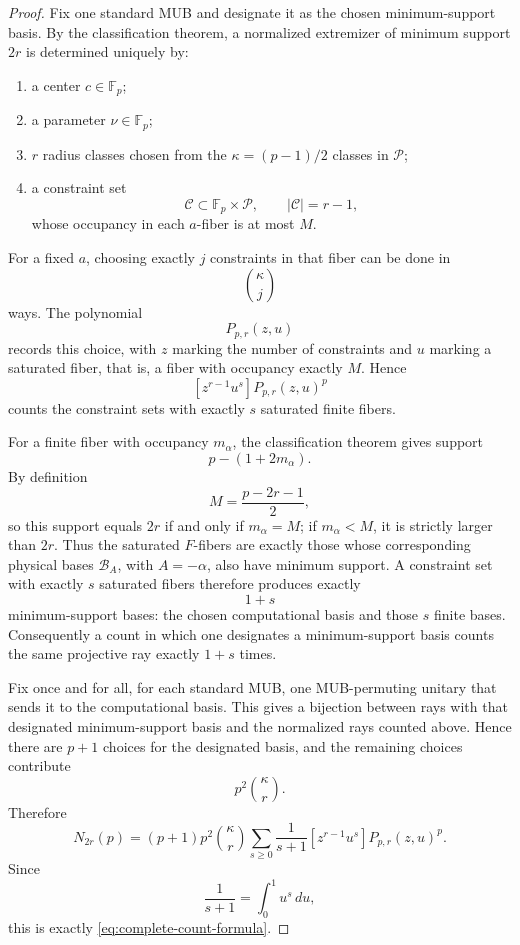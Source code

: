 \documentclass[11pt]{article}
\newcommand{\F}{\mathbb F}
\begin{document}
\begin{proof}
Fix one standard MUB and designate it as the chosen minimum-support
basis.  By the classification theorem, a normalized extremizer of
minimum support \(2r\) is determined uniquely by:

\begin{enumerate}
\item a center \(c\in\F_p\);
\item a parameter \(\nu\in\F_p\);
\item \(r\) radius classes chosen from the \(\kappa=(p-1)/2\) classes in
\(\mathcal P\);
\item a constraint set
\[
 \mathcal C\subset\F_p\times\mathcal P,
 \qquad
 |\mathcal C|=r-1,
\]
whose occupancy in each \(a\)-fiber is at most \(M\).
\end{enumerate}

For a fixed \(a\), choosing exactly \(j\) constraints in that fiber can
be done in
\[
 \binom{\kappa}{j}
\]
ways.  The polynomial
\[
 P_{p,r}(z,u)
\]
records this choice, with \(z\) marking the number of constraints and
\(u\) marking a saturated fiber, that is, a fiber with occupancy
exactly \(M\).  Hence
\[
 [z^{r-1}u^s]P_{p,r}(z,u)^p
\]
counts the constraint sets with exactly \(s\) saturated finite fibers.

For a finite fiber with occupancy \(m_\alpha\), the classification
theorem gives support
\[
 p-(1+2m_\alpha).
\]
By definition
\[
 M=\frac{p-2r-1}{2},
\]
so this support equals \(2r\) if and only if \(m_\alpha=M\); if
\(m_\alpha<M\), it is strictly larger than \(2r\).  Thus the saturated \(F\)-fibers are exactly those whose corresponding
physical bases \(\mathcal B_A\), with \(A=-\alpha\), also have minimum support.  A
constraint set with exactly \(s\) saturated fibers therefore produces exactly
\[
 1+s
\]
minimum-support bases: the chosen computational basis and those \(s\) finite
bases.  Consequently a count in which one designates a minimum-support basis
counts the same projective ray exactly \(1+s\) times.

Fix once and for all, for each standard MUB, one MUB-permuting unitary
that sends it to the computational basis.  This gives a bijection between
rays with that designated minimum-support basis and the normalized rays
counted above.  Hence there are \(p+1\) choices for the designated basis,
and the remaining choices contribute
\[
 p^2\binom{\kappa}{r}.
\]
Therefore
\[
 N_{2r}(p)
 =
 (p+1)p^2\binom{\kappa}{r}
 \sum_{s\ge0}
 \frac{1}{s+1}
 [z^{r-1}u^s]P_{p,r}(z,u)^p.
\]
Since
\[
 \frac1{s+1}=\int_0^1u^s\,du,
\]
this is exactly \eqref{eq:complete-count-formula}.
\end{proof}
\end{document}
